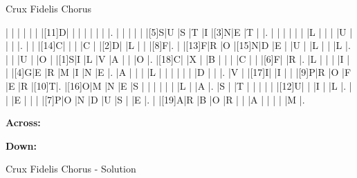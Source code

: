\documentclass[12pt]{article}
\begin{document}
\begin{center}
  \huge{Crux Fidelis Chorus}
\end{center}
\vspace{1.5cm}
\begin{Puzzle}{15}{15}
  |{}  |{}  |{}  |{}  |{}  |{}  |[11]D|{}  |{}  |{}  |{}  |{}  |{}  |{}  |.
  |{}  |{}  |{}  |{}  |{}  |[5]S|U   |S   |T   |I   |[3]N|E   |T   |{}  |.
  |{}  |{}  |{}  |{}  |{}  |{}  |L   |{}  |{}  |{}  |U   |{}  |{}  |{}  |.
  |{}  |{}  |[14]C|{}  |{}  |{}  |C   |{}  |[2]D|{}  |L   |{}  |{}  |[8]F|.
  |{}  |[13]F|R   |O   |[15]N|D   |E   |{}  |U   |{}  |L   |{}  |{}  |L   |.
  |{}  |{}  |U   |{}  |O   |{}  |[1]S|I   |L   |V   |A   |{}  |{}  |O   |.
  |[18]C|{}  |X   |{}  |B   |{}  |{}  |{}  |C   |{}  |{}  |[6]F|{}  |R   |.
  |L   |{}  |{}  |{}  |I   |{}  |{}  |[4]G|E   |R   |M   |I   |N   |E   |.
  |A   |{}  |{}  |{}  |L   |{}  |{}  |{}  |{}  |{}  |{}  |D   |{}  |{}  |.
  |V   |{}  |[17]I|{}  |I   |{}  |{}  |[9]P|R   |O   |F   |E   |R   |[10]T|.
  |[16]O|M   |N   |E   |S   |{}  |{}  |{}  |{}  |{}  |{}  |L   |{}  |A   |.
  |S   |{}  |T   |{}  |{}  |{}  |{}  |{}  |[12]U|{}  |{}  |I   |{}  |L   |.
  |{}  |{}  |E   |{}  |{}  |{}  |[7]P|O   |N   |D   |U   |S   |{}  |E   |.
  |{}  |[19]A|R   |B   |O   |R   |{}  |{}  |A   |{}  |{}  |{}  |{}  |M   |.
\end{Puzzle}
\begin{PuzzleClues}{\textbf{Across:}}
\end{PuzzleClues}
\begin{PuzzleClues}{\textbf{Down:}}
\end{PuzzleClues}
\newpage
\begin{center}
  \huge{Crux Fidelis Chorus - Solution}
\end{center}
\vspace{1.5cm}
\PuzzleSolution
\end{document}
